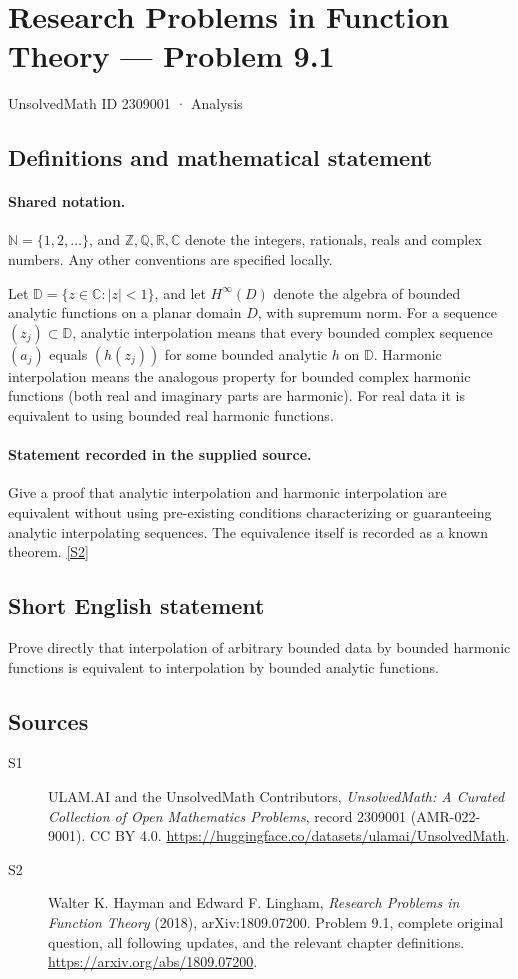 \documentclass[11pt]{book}
\newcommand{\sref}[2]{\hyperlink{source:#1:#2}{[S#2]}}
\begin{document}
\setcounter{section}{2309000}
\section{Research Problems in Function Theory — Problem 9.1}\label{2309001}
{\small\sffamily UnsolvedMath ID 2309001 · Analysis}
\subsection{Definitions and mathematical statement}

\paragraph{Shared notation.}$\mathbb N=\{1,2,\ldots\}$, and $\mathbb Z,\mathbb Q,\mathbb R,\mathbb C$ denote the integers, rationals, reals and complex numbers. Any other conventions are specified locally.


Let $\mathbb D=\{z\in\mathbb C:|z|<1\}$, and let $H^{\infty}(D)$ denote the algebra of bounded analytic functions on a planar domain $D$, with supremum norm. For a sequence $(z_j)\subset\mathbb D$, analytic interpolation means that every bounded complex sequence $(a_j)$ equals $(h(z_j))$ for some bounded analytic $h$ on $\mathbb D$. Harmonic interpolation means the analogous property for bounded complex harmonic functions (both real and imaginary parts are harmonic). For real data it is equivalent to using bounded real harmonic functions.
\paragraph{Statement recorded in the supplied source.}
Give a proof that analytic interpolation and harmonic interpolation are equivalent without using pre-existing conditions characterizing or guaranteeing analytic interpolating sequences. The equivalence itself is recorded as a known theorem. \sref{2309001}{2}
\subsection{Short English statement}
Prove directly that interpolation of arbitrary bounded data by bounded harmonic functions is equivalent to interpolation by bounded analytic functions.
\subsection{Sources}
\begin{description}
\item[\hypertarget{source:2309001:1}{S1}] ULAM.AI and the UnsolvedMath Contributors, \emph{UnsolvedMath: A Curated Collection of Open Mathematics Problems}, record 2309001 (AMR-022-9001). CC BY 4.0. \url{https://huggingface.co/datasets/ulamai/UnsolvedMath}.
\item[\hypertarget{source:2309001:2}{S2}] Walter K. Hayman and Edward F. Lingham, \emph{Research Problems in Function Theory} (2018), arXiv:1809.07200. Problem 9.1, complete original question, all following updates, and the relevant chapter definitions. \url{https://arxiv.org/abs/1809.07200}.
\end{description}
\label{end:2309001}
\end{document}
